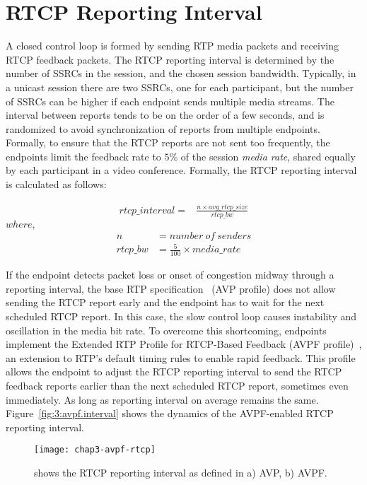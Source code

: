 \section{RTCP Reporting Interval}

A closed control loop is formed by sending RTP media packets and receiving
RTCP feedback packets. The RTCP reporting interval is determined by the number
of SSRCs in the session, and the chosen session bandwidth. Typically, in a
unicast session there are two SSRCs, one for each participant, but the number
of SSRCs can be higher if each endpoint sends multiple media streams. The
interval between reports tends to be on the order of a few seconds, and is
randomized to avoid synchronization of reports from multiple endpoints.
Formally, to ensure that the RTCP reports are not sent too frequently, the
endpoints limit the feedback rate to $5\%$ of the session \textit{media rate},
shared equally by each participant in a video conference. Formally, the RTCP
reporting interval is calculated as follows:

\begin{align}
rtcp\_interval = & \frac{n \times avg\_rtcp\_size}{rtcp\_bw}
\label{eq:rtcp.int}
\end{align}
\hspace{35mm}$where,$
\begin{align*}
n &=  number\ of\ senders \\
rtcp\_bw &=  \frac{5}{100} \times media\_rate
\end{align*}



If the endpoint detects packet loss or onset of congestion midway through a
reporting interval, the base RTP specification~\cite{rfc3550} (AVP profile)
does not allow sending the RTCP report early and the endpoint has to wait for
the next scheduled RTCP report. In this case, the slow control loop causes
instability and oscillation in the media bit rate. To overcome this
shortcoming, endpoints implement the Extended RTP Profile for RTCP-Based
Feedback (AVPF profile)~\cite{rfc4585}, an extension to RTP's default timing
rules to enable rapid feedback. This profile allows the endpoint to adjust the
RTCP reporting interval to send the RTCP feedback reports earlier than the
next scheduled RTCP report, sometimes even immediately. As long as reporting
interval on average remains the same. Figure~\ref{fig:3:avpf.interval} shows
the dynamics of the AVPF-enabled RTCP reporting interval.

\begin{figure}[!h]
\centerline{\texttt{[image: chap3-avpf-rtcp]}}
\caption{shows the RTCP reporting interval as defined in a) AVP, b) AVPF.}
\label{fig:3:avpf}
\end{figure}


